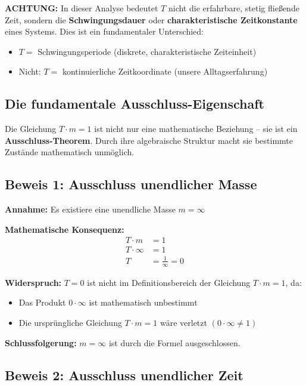\documentclass[12pt,a4paper]{article}
\theoremstyle{definition}
\theoremstyle{remark}
\begin{document}
\textbf{ACHTUNG:} In dieser Analyse bedeutet $T$ nicht die erfahrbare, stetig fließende Zeit, sondern die \textbf{Schwingungsdauer} oder \textbf{charakteristische Zeitkonstante} eines Systems. Dies ist ein fundamentaler Unterschied:

\begin{itemize}
	\item $T =$ Schwingungsperiode (diskrete, charakteristische Zeiteinheit)
	\item Nicht: $T =$ kontinuierliche Zeitkoordinate (unsere Alltagserfahrung)
\end{itemize}

\subsection{Die fundamentale Ausschluss-Eigenschaft}

Die Gleichung $T \cdot m = 1$ ist nicht nur eine mathematische Beziehung -- sie ist ein \textbf{Ausschluss-Theorem}. Durch ihre algebraische Struktur macht sie bestimmte Zustände mathematisch unmöglich.

\subsection{Beweis 1: Ausschluss unendlicher Masse}

\textbf{Annahme:} Es existiere eine unendliche Masse $m = \infty$

\textbf{Mathematische Konsequenz:}
\begin{align}
	T \cdot m &= 1\\
	T \cdot \infty &= 1\\
	T &= \frac{1}{\infty} = 0
\end{align}

\textbf{Widerspruch:} $T = 0$ ist nicht im Definitionsbereich der Gleichung $T \cdot m = 1$, da:
\begin{itemize}
	\item Das Produkt $0 \cdot \infty$ ist mathematisch unbestimmt
	\item Die ursprüngliche Gleichung $T \cdot m = 1$ wäre verletzt $(0 \cdot \infty \neq 1)$
\end{itemize}

\textbf{Schlussfolgerung:} $m = \infty$ ist durch die Formel ausgeschlossen.

\subsection{Beweis 2: Ausschluss unendlicher Zeit}
\end{document}
